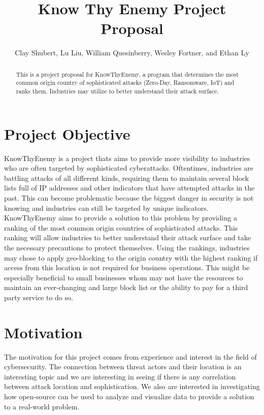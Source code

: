 \documentclass[letterpaper, 10 pt, conference]{ieeeconf}  %
\title{\LARGE \bf
Know Thy Enemy Project Proposal
}
\author{Clay Shubert, Lu Liu, William Quesinberry, Wesley Fortner, and Ethan Ly %
}
\begin{document}
\maketitle
\thispagestyle{empty}
\pagestyle{empty}



\begin{abstract}

This is a project proposal for KnowThyEnemy, a program that determines the most common origin country of sophisticated attacks (Zero-Day, Ransomware, IoT) and ranks them. Industries may utilize to better understand their attack surface. 

\end{abstract}



\section{Project Objective}

KnowThyEnemy is a project thats aims to provide more visibility to industries who are often targeted by sophisticated cyberattacks. 
Oftentimes, industries are battling attacks of all different kinds, requiring them to maintain several block lists full of IP addresses and other indicators that have attempted attacks in the past. 
This can become problematic because the biggest danger in security is not knowing and industries can still be targeted by unique indicators. 
KnowThyEnemy aims to provide a solution to this problem by providing a ranking of the most common origin countries of sophisticated attacks. 
This ranking will allow industries to better understand their attack surface and take the necessary precautions to protect themselves. 
Using the rankings, industries may chose to apply geo-blocking to the origin country with the highest ranking if access from this location is not required for business operations.
This might be especially beneficial to small businesses whom may not have the resources to maintain an ever-changing and large block list or the ability to pay for a third party service to do so.

\section{Motivation}

The motivation for this project comes from experience and interest in the field of cybersecurity. 
The connection between threat actors and their location is an interesting topic and we are interesting in seeing if there is any correlation between attack location and sophistication. 
We also are interested in investigating how open-source can be used to analyze and visualize data to provide a solution to a real-world problem.
\end{document}
